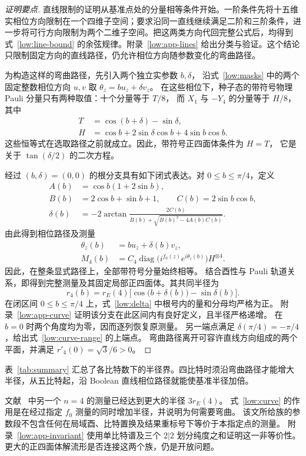 \begin{proof}[证明要点]
直线限制的证明从基准点处的分量相等条件开始。一阶条件先将十五维实相位方向限制在一个四维子空间；要求沿同一直线继续满足二阶和三阶条件，进一步将可行方向限制为两个二维子空间。把这两类方向代回完整公式后，均得到式~\eqref{low:line-bound} 的余弦规律。附录~\ref{low:app-lines} 给出分类与验证。这个结论只限制固定方向的直线路径，仍允许相位方向随参数变化的弯曲路径。

为构造这样的弯曲路径，先引入两个独立实参数 $b,\delta$，
沿式~\eqref{low:masks} 中的两个固定整数相位方向 $u,v$ 取 $\theta_z=bu_z+\delta v_z$。
在这些相位下，种子态的带符号物理 Pauli 分量只有两种取值：十个分量等于 $T/8$，
而 $X_1$ 与 $-Y_4$ 的分量等于 $H/8$，其中
\begin{align}
 T&=\cos(b+\delta)-\sin\delta,\nonumber\\
 H&=\cos b+2\sin\delta\cos b+4\sin b\cos b.
 \label{low:two-components}
\end{align}
这些恒等式在选取路径之前就成立。因此，带符号正四面体条件为 $H=T$，
它是关于 $\tan(\delta/2)$ 的二次方程。

经过 $(b,\delta)=(0,0)$ 的根分支具有如下闭式表达。对 $0\le b\le\pi/4$，定义
\begin{align}
 A(b)&=\cos b(1+2\sin b),\nonumber\\
 B(b)&=2\cos b+\sin b+1,\qquad
 C(b)=2\sin b\cos b,\nonumber\\
 \delta(b)&=-2\arctan\frac{2C(b)}
 {B(b)+\sqrt{B(b)^2-4A(b)C(b)}}.
 \label{low:delta}
\end{align}
由此得到相位路径及测量
\begin{equation}
 \begin{aligned}
 \theta_z(b)&=bu_z+\delta(b)v_z,\\
 M_4(b)&=C_4\operatorname{diag}
 \bigl(i^{f_0(z)}e^{i\theta_z(b)}\bigr)H^{\otimes4}.
 \end{aligned}
 \label{low:curve}
\end{equation}
因此，在整条显式路径上，全部带符号分量始终相等。
结合酉性与 Pauli 轨道关系，即得到完整测量及其固定局部正四面体。其共同半径为
\begin{equation}
 r_4(b)=r_E(4)\bigl[\cos\bigl(b+\delta(b)\bigr)-\sin\delta(b)\bigr].
 \label{low:curve-radius}
\end{equation}
在闭区间 $0\le b\le\pi/4$ 上，式~\eqref{low:delta} 中根号内的量和分母均严格为正。
附录~\ref{low:app-curve} 证明该分支在此区间内有良好定义，且半径严格递增。
在 $b=0$ 时两个角度均为零，因而逐列恢复原测量。
另一端点满足 $\delta(\pi/4)=-\pi/4$，给出式~\eqref{low:curve-range} 的上端点。
弯曲路径离开可容许直线方向组成的两个平面，并满足 $r'_4(0)=\sqrt3/6>0$。
\end{proof}

表~\ref{tab:summary} 汇总了各比特数下的半径界。四比特时须沿弯曲路径才能增大半径，从五比特起，沿 Boolean 直线相位路径就能使基准半径加倍。


文献~\cite{PauwelsGisin2026} 中另一个 $n=4$ 的测量已经达到更大的半径 $3r_E(4)$。
式~\eqref{low:curve} 的作用是在经过指定 $f_0$ 测量的同时增加半径，并说明为何需要弯曲。
该文所给族的参数段不包含任何在局域酉、比特置换及结果重标号下等价于本指定点的测量。
附录~\ref{low:app-invariant} 使用单比特谱及三个 $2|2$ 划分纯度之和证明这一非等价性。
更大的正四面体解流形是否连接这两个族，仍是开放问题。
